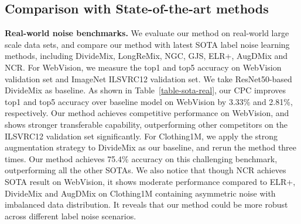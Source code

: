 \documentclass{article} \usepackage{iclr2023_conference,times}
\begin{document}
\subsection{Comparison with State-of-the-art methods}
\textbf{Real-world noise benchmarks.} We evaluate our method on real-world large scale data sets, and compare our method with latest SOTA label noise learning methods, including DivideMix\citep{Li2020DivideMixLW}, LongReMix\citep{cordeiro2022longremix}, NGC\citep{wu2021ngc}, GJS\citep{englesson2021generalized}, ELR+\citep{liu2020early}, AugDMix\citep{nishi2021augmentation} and NCR\citep{huang2021learning}. For WebVision, we measure the top1 and top5 accuracy on WebVision validation set and ImageNet ILSVRC12 validation set. We take ResNet50-based DivideMix \citep{DBLP:journals/corr/abs-2103-13646} as baseline. As shown in Table~\ref{table-sota-real}, our CPC improves top1 and top5 accuracy over baseline model on WebVision by 3.33\% and 2.81\%, respectively. Our method achieves competitive performance on WebVision, and shows stronger transferable capability,  outperforming other competitors on the ILSVRC12 validation set significantly. For Clothing1M, we apply the strong augmentation strategy \citep{nishi2021augmentation} to DivideMix as our baseline, and rerun the method three times. Our method achieves 75.4\% accuracy on this challenging benchmark, outperforming all the other SOTAs. We also notice that though NCR achieves SOTA result on WebVision, it shows moderate performance compared to ELR+, DivideMix and AugDMix on Clothing1M  containing asymmetric noise with imbalanced data distribution. It reveals that our method could be more robust across different label noise scenarios.
\end{document}
